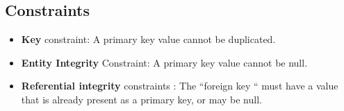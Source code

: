 \subsection{Constraints}
\begin{itemize}
    \item \textbf{Key} constraint: A primary key value cannot be duplicated.
    \item \textbf{Entity Integrity} Constraint: A primary key value cannot be null. 
    \item \textbf{Referential integrity} constraints : The “foreign key “ must have a value that is already present as a primary key, or may be null.
\end{itemize}


\newpage
